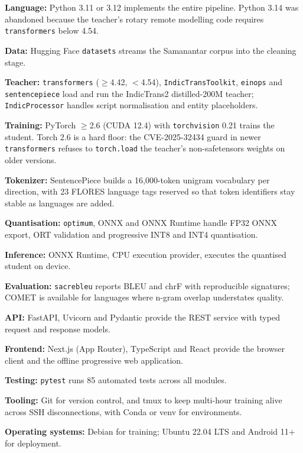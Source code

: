 \begin{bullets}
\item \textbf{Language:} Python 3.11 or 3.12 implements the entire pipeline. Python 3.14 was abandoned because the teacher's rotary remote modelling code requires \texttt{transformers} below 4.54.
\item \textbf{Data:} Hugging Face \texttt{datasets} streams the Samanantar corpus into the cleaning stage.
\item \textbf{Teacher:} \texttt{transformers} ($\geq$4.42, $<$4.54), \texttt{IndicTransToolkit}, \texttt{einops} and \texttt{sentencepiece} load and run the IndicTrans2 distilled-200M teacher; \texttt{IndicProcessor} handles script normalisation and entity placeholders.
\item \textbf{Training:} PyTorch $\geq$2.6 (CUDA 12.4) with \texttt{torchvision} 0.21 trains the student. Torch 2.6 is a hard floor: the CVE-2025-32434 guard in newer \texttt{transformers} refuses to \texttt{torch.load} the teacher's non-safetensors weights on older versions.
\item \textbf{Tokenizer:} SentencePiece builds a 16{,}000-token unigram vocabulary per direction, with 23 FLORES language tags reserved so that token identifiers stay stable as languages are added.
\item \textbf{Quantisation:} \texttt{optimum}, ONNX and ONNX Runtime handle FP32 ONNX export, ORT validation and progressive INT8 and INT4 quantisation.
\item \textbf{Inference:} ONNX Runtime, CPU execution provider, executes the quantised student on device.
\item \textbf{Evaluation:} \texttt{sacrebleu} reports BLEU and chrF with reproducible signatures; COMET is available for languages where n-gram overlap understates quality.
\item \textbf{API:} FastAPI, Uvicorn and Pydantic provide the REST service with typed request and response models.
\item \textbf{Frontend:} Next.js (App Router), TypeScript and React provide the browser client and the offline progressive web application.
\item \textbf{Testing:} \texttt{pytest} runs 85 automated tests across all modules.
\item \textbf{Tooling:} Git for version control, and tmux to keep multi-hour training alive across SSH disconnections, with Conda or venv for environments.
\item \textbf{Operating systems:} Debian for training; Ubuntu 22.04 LTS and Android 11+ for deployment.
\end{bullets}


